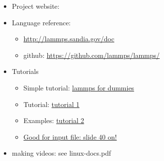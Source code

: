\documentclass[%
preprint,
superscriptaddress,
 amsmath,amssymb,
prapplied,
floatfix,
tightenlines,
]{revtex4-2}
\begin{document}
\begin{itemize}
\item Project website: 
\item Language reference: 
   \begin{itemize}
      \item \href{http://lammps.sandia.gov/doc}{http://lammps.sandia.gov/doc}
      \item github: \href{ https://github.com/lammps/lammps/}{https://github.com/lammps/lammps/}
   \end{itemize}
\item Tutorials
   \begin{itemize}
      \item Simple tutorial: \href{http://wp.df.uba.ar/gebi/wp-content/uploads/sites/9/2016/06/lammps.pdf}{lammps for dummies}
      \item Tutorial: \href{https://icme.hpc.msstate.edu/mediawiki/index.php/LAMMPS_Tutorial_1}{tutorial 1}%
      \item Examples: \href{https://icme.hpc.msstate.edu/mediawiki/index.php/LAMMPS_tutorials}{tutorial 2}%
      \item \href{http://puccini.che.pitt.edu/~karlj/Classes/CHE3935/MD_simulations.pdf}{Good for input file: slide 40 on!}
   \end{itemize}

\item making videos: see linux-docs.pdf
\end{itemize}



%
%
{   \def\litdir{x:/sawoptik_databases/jabref} }
{	\def\litdir{c:/myfiles/jabref} }

%

\end{document}

